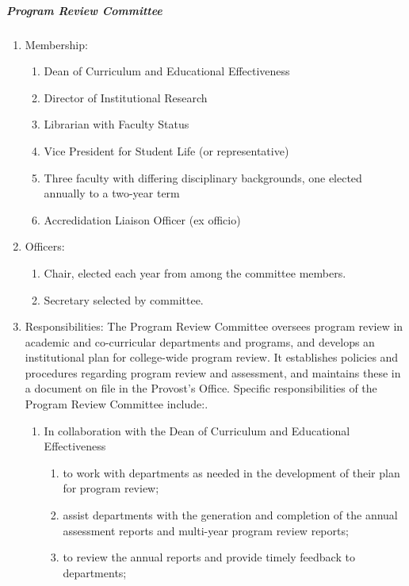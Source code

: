 \documentclass[letterpaper, 11pt]{article}
\begin{document}
				\subparagraph{Program Review Committee}
					\begin{enumerate}[label=\alph*)]
						\item{Membership:
							\begin{enumerate}[label=\arabic*)]
								\item{Dean of Curriculum and Educational Effectiveness}
								\item{Director of Institutional Research}
								\item{Librarian with Faculty Status}
								\item{Vice President for Student Life (or representative)}
								\item{Three faculty with differing disciplinary backgrounds, one elected annually to a two-year term}
								\item{Accredidation Liaison Officer (ex officio)}
							\end{enumerate}
						}
						\item{Officers:
							\begin{enumerate}[label=\arabic*)]
								\item{Chair, elected each year from among the committee members.}
								\item{Secretary selected by committee.}
							\end{enumerate}
						}
						\item{Responsibilities:
							The Program Review Committee oversees program review in academic and co-curricular departments and programs, and develops an institutional plan for college-wide program review.  It establishes policies and procedures regarding program review and assessment, and maintains these in a document on file in the Provost's Office.  Specific responsibilities of the Program Review Committee include:.
							\begin{enumerate}[label=\arabic*)]
								\item{In collaboration with the Dean of Curriculum and Educational Effectiveness
									\begin{enumerate}[label=(\alph*)]
										\item{to work with departments as needed in the development of their plan for program review;}
										\item{assist departments with the generation and completion of the annual assessment reports and multi-year program review reports;}
										\item{to review the annual reports and provide timely feedback to departments;}

\end{enumerate}}
\end{enumerate}}
\end{enumerate}
\end{document}
